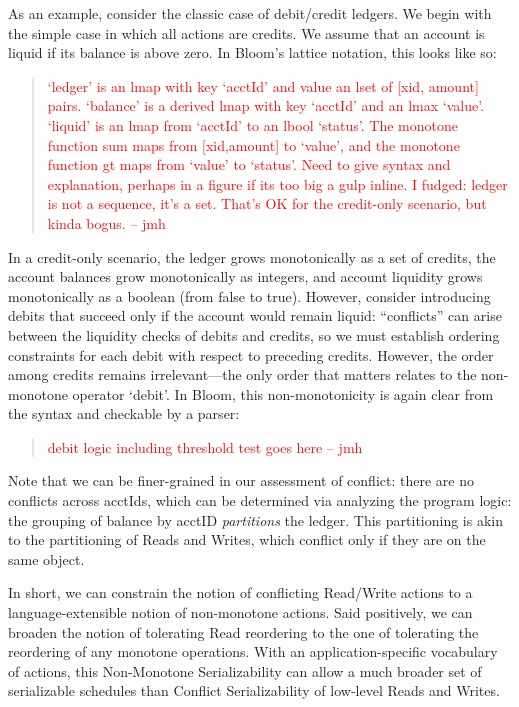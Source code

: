\documentclass{sig-alternate}
\newcommand{\jmh}[1]{{\textcolor{red}{#1 -- jmh}}}
\begin{document}
As an example, consider the classic case of debit/credit ledgers.  We begin with
the simple case in which all actions are credits. We assume that an account is
liquid if its balance is above zero. In Bloom's lattice notation, this looks
like so:
\begin{quote}
  \jmh{`ledger' is an lmap with key `acctId' and value an lset of [xid, amount]
    pairs.  `balance' is a derived lmap with key `acctId' and an lmax `value'.
    `liquid' is an lmap from `acctId' to an lbool `status'.  The monotone
    function sum maps from [xid,amount] to `value', and the monotone function gt
    maps from `value' to `status'. Need to give syntax and explanation, perhaps
    in a figure if its too big a gulp inline.  I fudged: ledger is not a
    sequence, it's a set.  That's OK for the credit-only scenario, but kinda
    bogus.}
\end{quote}
In a credit-only scenario, the ledger grows monotonically as a set of credits,
the account balances grow monotonically as integers, and account liquidity grows
monotonically as a boolean (from false to true).  However, consider introducing
debits that succeed only if the account would remain liquid: ``conflicts'' can
arise between the liquidity checks of debits and credits, so we must establish
ordering constraints for each debit with respect to preceding credits.  However,
the order among credits remains irrelevant---the only order that matters relates
to the non-monotone operator `debit'.  In Bloom, this non-monotonicity is again
clear from the syntax and checkable by a parser:
\begin{quote}
	\jmh{debit logic including threshold test goes here}
\end{quote}
Note that we can be finer-grained in our assessment of conflict: there are no
conflicts across acctIds, which can be determined via analyzing the program
logic: the grouping of balance by acctID \emph{partitions} the ledger.  This
partitioning is akin to the partitioning of Reads and Writes, which conflict
only if they are on the same object.

In short, we can constrain the notion of conflicting Read/Write actions to a
language-extensible notion of non-monotone actions.  Said positively, we can
broaden the notion of tolerating Read reordering to the one of tolerating the
reordering of any monotone operations.  With an application-specific vocabulary
of actions, this Non-Monotone Serializability can allow a much broader set of
serializable schedules than Conflict Serializability of low-level Reads and
Writes.
\end{document}
